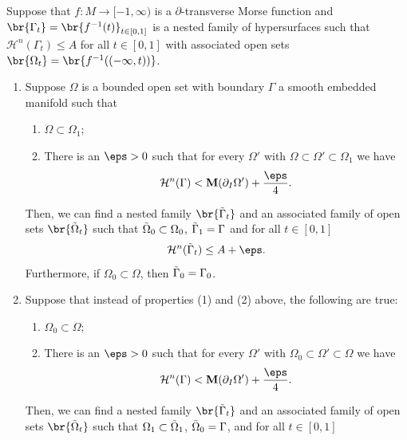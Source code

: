 \begin{lemma}\label{lem:extension}
    Suppose that $f: M \to [-1, \infty)$ is a $\partial$-transverse Morse function and $\br{\Gamma_t} = \br{f^{-1}(t)}_{t \in [0, 1]}$ is a nested family of hypersurfaces such that $\mathcal{H}^n(\Gamma_t) \leq A$ for all $t \in [0, 1]$ with associated open sets $\br{\Omega_t} = \br{f^{-1}((-\infty, t))}$.
    \begin{enumerate}
        \item[I.] Suppose $\Omega$ is a bounded open set with boundary $\Gamma$ a smooth embedded manifold such that
        \begin{enumerate}
            \item[(1)] $\Omega\subset\Omega_1$;
            \item[(2)] There is an $\eps > 0$ such that for every $\Omega'$ with $\Omega \subset \Omega'\subset \Omega_1$ we have
            \begin{equation*}
                \mathcal{H}^n(\Gamma) < \mathbf{M}(\partial_I\Omega') + \frac{\eps}{4}.
            \end{equation*}
        \end{enumerate}
        Then, we can find a nested family $\br{\Tilde{\Gamma}_t}$ and an associated family of open sets $\br{\Tilde{\Omega}_t}$ such that $\Tilde{\Omega}_0 \subset \Omega_0$, $\Tilde{\Gamma}_1 = \Gamma$ and for all $t \in [0, 1]$
        \begin{equation*}
            \mathcal{H}^n(\Tilde{\Gamma}_t) \leq A + \eps.
        \end{equation*}
        Furthermore, if $\Omega_0 \subset \Omega$, then $\Tilde{\Gamma}_0 = \Gamma_0$.
        \item[II.] Suppose that instead of properties (1) and (2) above, the following are true:
        \begin{enumerate}
            \item[(1)'] $\Omega_0 \subset \Omega$;
            \item[(2)'] There is an $\eps > 0$ such that for every $\Omega'$ with $\Omega_0\subset \Omega'\subset \Omega$ we have
            \begin{equation*}
                \mathcal{H}^n(\Gamma) < \mathbf{M}(\partial_I\Omega') + \frac{\eps}{4}.
            \end{equation*}
        \end{enumerate}
        Then, we can find a nested family $\br{\Tilde{\Gamma}_t}$ and an associated family of open sets $\br{\Tilde{\Omega}_t}$ such that $\Omega_1 \subset \Tilde{\Omega}_1$, $\Tilde{\Omega}_0 = \Gamma$, and for all $t \in [0, 1]$

\end{enumerate}
\end{lemma}
